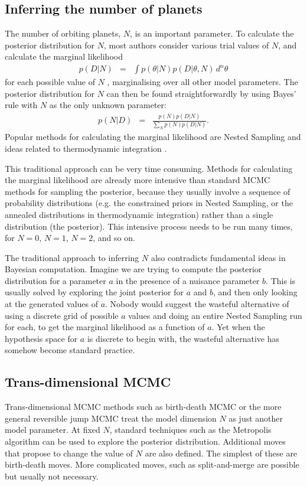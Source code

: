\documentclass[useAMS,usenatbib]{mn2e}
\begin{document}
\subsection{Inferring the number of planets}
The number of orbiting planets, $N$, is an important parameter.
To calculate the posterior distribution for $N$, most authors
consider various trial values of $N$, and calculate the marginal likelihood
\begin{eqnarray}
p(D | N) &=& \int p(\theta | N) p(D | \theta, N) \, d^n \theta
\end{eqnarray}
for each possible value of $N$
\citep[e.g.][]{2011MNRAS.415.2523G, 2011MNRAS.415.3462F, 2014MNRAS.437.3540F, fengji}, marginalising
over all other model parameters.
The posterior distribution for $N$ can then be found straightforwardly by
using Bayes' rule with $N$ as the only unknown parameter:
\begin{eqnarray}
p(N | D) &=& \frac{p(N)p(D | N)}{\sum_N p(N)p(D | N)}.
\end{eqnarray}
Popular
methods for calculating the marginal likelihood are Nested Sampling
\citep{skilling} and ideas related to thermodynamic integration
\citep[e.g.][]{neal}.

This traditional approach can be very time consuming.
Methods for calculating the marginal likelihood are
already more intensive than standard MCMC methods for sampling the posterior,
because they usually involve a sequence of probability distributions
(e.g. the constrained priors in Nested Sampling, or the annealed distributions
in thermodynamic integration) rather than a single distribution (the posterior).
This intensive process needs to be run many times, for $N=0$, $N=1$, $N=2$, and
so on.

The traditional approach to inferring $N$ also contradicts
fundamental ideas in Bayesian
computation. Imagine we are trying to compute the posterior distribution for
a parameter $a$ in the presence of a nuisance parameter $b$. This is usually solved
by exploring the joint posterior for $a$ and $b$, and then only looking at the
generated values of $a$. Nobody would suggest the wasteful alternative
of using a discrete grid of possible $a$ values and doing an entire Nested
Sampling run for each, to get the marginal likelihood as a function of $a$.
Yet when the hypothesis space for $a$ is discrete to begin with, the wasteful
alternative has somehow become standard practice.



\subsection{Trans-dimensional MCMC}
Trans-dimensional MCMC methods such as birth-death MCMC \citep{birthdeath} or the
more general reversible jump MCMC \citep{green} treat the model dimension
$N$ as just another model parameter. At fixed $N$, standard techniques such
as the Metropolis algorithm can be used to explore the posterior distribution.
Additional moves that propose to change the value of $N$ are also defined. The
simplest of these are birth-death moves. More complicated moves, such as
split-and-merge \citep[e.g.][]{umstatter} are possible but usually not necessary.
\end{document}
